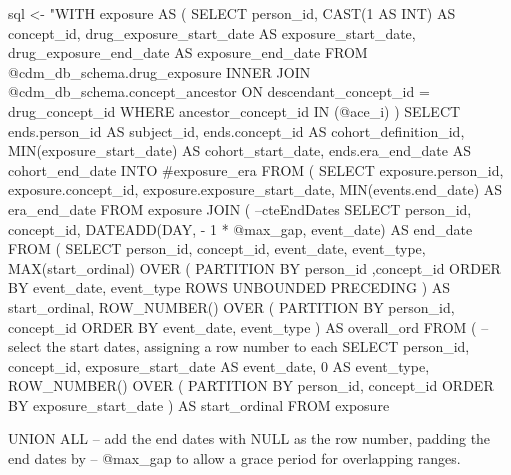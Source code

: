 \documentclass[11pt]{book}
\newenvironment{Shaded}{\begin{snugshade}}{\end{snugshade}}
\newcommand{\NormalTok}[1]{#1}
\newcommand{\StringTok}[1]{\textcolor[rgb]{0.31,0.60,0.02}{#1}}
\theoremstyle{definition}
\theoremstyle{definition}
\theoremstyle{definition}
\theoremstyle{remark}
\begin{document}
\begin{Shaded}
\begin{Highlighting}[]
\NormalTok{sql <-}\StringTok{ "WITH exposure AS (}
\StringTok{  SELECT person_id,}
\StringTok{    CAST(1 AS INT) AS concept_id,}
\StringTok{    drug_exposure_start_date AS exposure_start_date,}
\StringTok{    drug_exposure_end_date AS exposure_end_date}
\StringTok{  FROM @cdm_db_schema.drug_exposure}
\StringTok{  INNER JOIN @cdm_db_schema.concept_ancestor}
\StringTok{    ON descendant_concept_id = drug_concept_id}
\StringTok{  WHERE ancestor_concept_id IN (@ace_i)}
\StringTok{)}
\StringTok{SELECT ends.person_id AS subject_id,}
\StringTok{    ends.concept_id AS cohort_definition_id,}
\StringTok{  MIN(exposure_start_date) AS cohort_start_date,}
\StringTok{  ends.era_end_date AS cohort_end_date}
\StringTok{INTO #exposure_era}
\StringTok{FROM (}
\StringTok{  SELECT exposure.person_id,}
\StringTok{    exposure.concept_id,}
\StringTok{    exposure.exposure_start_date,}
\StringTok{    MIN(events.end_date) AS era_end_date}
\StringTok{  FROM  exposure}
\StringTok{  JOIN (}
\StringTok{--cteEndDates}
\StringTok{    SELECT person_id,}
\StringTok{      concept_id,}
\StringTok{      DATEADD(DAY, - 1 * @max_gap, event_date) AS end_date}
\StringTok{    FROM (}
\StringTok{      SELECT person_id,}
\StringTok{        concept_id,}
\StringTok{        event_date,}
\StringTok{        event_type,}
\StringTok{        MAX(start_ordinal) OVER (}
\StringTok{          PARTITION BY person_id ,concept_id ORDER BY event_date,}
\StringTok{              event_type ROWS UNBOUNDED PRECEDING}
\StringTok{          ) AS start_ordinal,}
\StringTok{        ROW_NUMBER() OVER (}
\StringTok{          PARTITION BY person_id, concept_id ORDER BY event_date,}
\StringTok{            event_type}
\StringTok{          ) AS overall_ord}
\StringTok{      FROM (}
\StringTok{-- select the start dates, assigning a row number to each}
\StringTok{        SELECT person_id,}
\StringTok{          concept_id,}
\StringTok{          exposure_start_date AS event_date,}
\StringTok{          0 AS event_type,}
\StringTok{          ROW_NUMBER() OVER (}
\StringTok{            PARTITION BY person_id, concept_id ORDER BY exposure_start_date}
\StringTok{            ) AS start_ordinal}
\StringTok{        FROM exposure}

\StringTok{        UNION ALL}
\StringTok{-- add the end dates with NULL as the row number, padding the end dates by}
\StringTok{-- @max_gap to allow a grace period for overlapping ranges.}


\end{Highlighting}
\end{Shaded}
\end{document}
